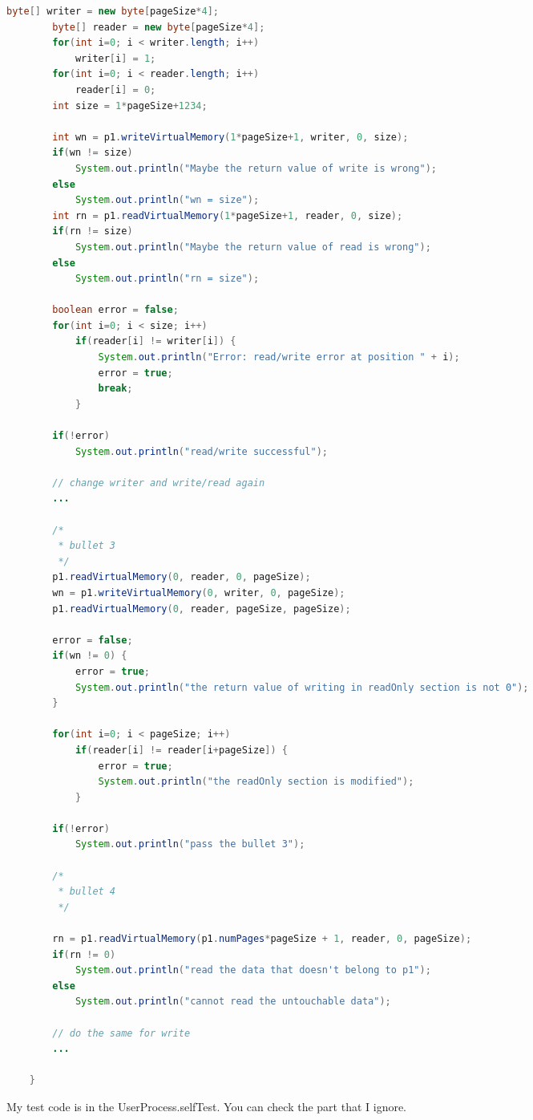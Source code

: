 \documentclass{article}
\begin{document}
\begin{spacing}{1.1}
\begin{lstlisting}[language=Java]
    	byte[] writer = new byte[pageSize*4];
    	byte[] reader = new byte[pageSize*4];
    	for(int i=0; i < writer.length; i++)
    		writer[i] = 1;
    	for(int i=0; i < reader.length; i++)
    		reader[i] = 0;
    	int size = 1*pageSize+1234;
    	
    	int wn = p1.writeVirtualMemory(1*pageSize+1, writer, 0, size);
    	if(wn != size)
    		System.out.println("Maybe the return value of write is wrong");
    	else
    		System.out.println("wn = size");
    	int rn = p1.readVirtualMemory(1*pageSize+1, reader, 0, size);
    	if(rn != size)
    		System.out.println("Maybe the return value of read is wrong");
    	else
    		System.out.println("rn = size");
    	
    	boolean error = false;
    	for(int i=0; i < size; i++)
    		if(reader[i] != writer[i]) {
    			System.out.println("Error: read/write error at position " + i);
    			error = true;
    			break;
    		}
    	
    	if(!error)
    		System.out.println("read/write successful");
    	
    	// change writer and write/read again
    	...

    	/*
    	 * bullet 3
    	 */
    	p1.readVirtualMemory(0, reader, 0, pageSize);
    	wn = p1.writeVirtualMemory(0, writer, 0, pageSize);
    	p1.readVirtualMemory(0, reader, pageSize, pageSize);
    	
    	error = false;
    	if(wn != 0) {
    		error = true;
    		System.out.println("the return value of writing in readOnly section is not 0");
    	}
    	
    	for(int i=0; i < pageSize; i++)
    		if(reader[i] != reader[i+pageSize]) {
    			error = true;
    			System.out.println("the readOnly section is modified");
    		}
    	
    	if(!error)
    		System.out.println("pass the bullet 3");
    	
    	/*
    	 * bullet 4
    	 */
    	
    	rn = p1.readVirtualMemory(p1.numPages*pageSize + 1, reader, 0, pageSize);
    	if(rn != 0)
    		System.out.println("read the data that doesn't belong to p1");
    	else
    		System.out.println("cannot read the untouchable data");
    	
    	// do the same for write
    	...

    }

\end{lstlisting}

My test code is in the \textsf{UserProcess.selfTest}. You can check the part that I ignore.



\end{spacing}
\end{document}
